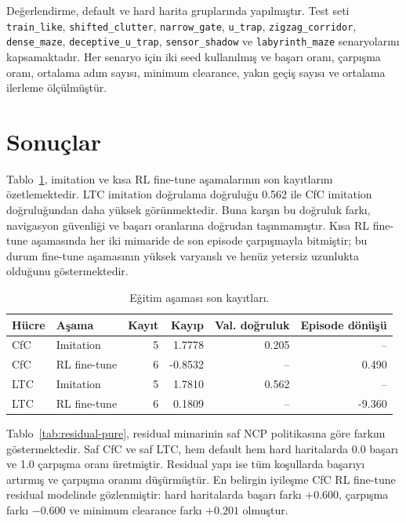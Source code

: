 \documentclass[11pt,a4paper]{article}
\begin{document}
Değerlendirme, default ve hard harita gruplarında yapılmıştır. Test seti \texttt{train\_like}, \texttt{shifted\_clutter}, \texttt{narrow\_gate}, \texttt{u\_trap}, \texttt{zigzag\_corridor}, \texttt{dense\_maze}, \texttt{deceptive\_u\_trap}, \texttt{sensor\_shadow} ve \texttt{labyrinth\_maze} senaryolarını kapsamaktadır. Her senaryo için iki seed kullanılmış ve başarı oranı, çarpışma oranı, ortalama adım sayısı, minimum clearance, yakın geçiş sayısı ve ortalama ilerleme ölçülmüştür.

\section{Sonuçlar}

Tablo~\ref{tab:training-summary}, imitation ve kısa RL fine-tune aşamalarının son kayıtlarını özetlemektedir. LTC imitation doğrulama doğruluğu \num{0.562} ile CfC imitation doğruluğundan daha yüksek görünmektedir. Buna karşın bu doğruluk farkı, navigasyon güvenliği ve başarı oranlarına doğrudan taşınmamıştır. Kısa RL fine-tune aşamasında her iki mimaride de son episode çarpışmayla bitmiştir; bu durum fine-tune aşamasının yüksek varyanslı ve henüz yetersiz uzunlukta olduğunu göstermektedir.

\begin{table}[htbp]
\centering
\caption{Eğitim aşaması son kayıtları.}
\label{tab:training-summary}
\begin{tabular}{llrrrr}
\toprule
Hücre & Aşama & Kayıt & Kayıp & Val. doğruluk & Episode dönüşü \\
\midrule
CfC & Imitation & 5 & 1.7778 & 0.205 & -- \\
CfC & RL fine-tune & 6 & -0.8532 & -- & 0.490 \\
LTC & Imitation & 5 & 1.7810 & 0.562 & -- \\
LTC & RL fine-tune & 6 & 0.1809 & -- & -9.360 \\
\bottomrule
\end{tabular}
\end{table}

Tablo~\ref{tab:residual-pure}, residual mimarinin saf NCP politikasına göre farkını göstermektedir. Saf CfC ve saf LTC, hem default hem hard haritalarda \num{0.0} başarı ve \num{1.0} çarpışma oranı üretmiştir. Residual yapı ise tüm koşullarda başarıyı artırmış ve çarpışma oranını düşürmüştür. En belirgin iyileşme CfC RL fine-tune residual modelinde gözlenmiştir: hard haritalarda başarı farkı \(+\num{0.600}\), çarpışma farkı \(-\num{0.600}\) ve minimum clearance farkı \(+\num{0.201}\) olmuştur.
\end{document}
